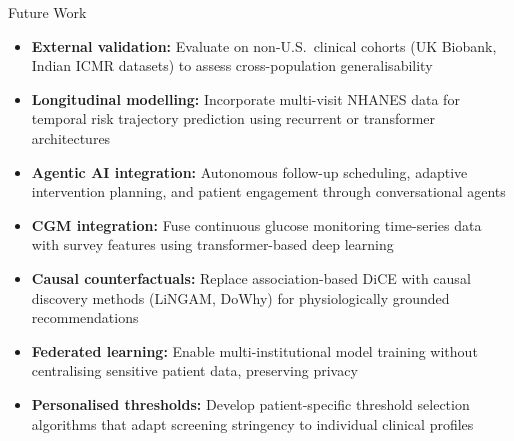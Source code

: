 \documentclass[aspectratio=169, 11pt]{beamer}
\begin{document}
\begin{frame}{Future Work}
  \small
  \begin{itemize}
    \setlength{\itemsep}{6pt}
    \item \textbf{External validation:} Evaluate on non-U.S.\ clinical cohorts (UK Biobank, Indian ICMR datasets) to assess cross-population generalisability
    \item \textbf{Longitudinal modelling:} Incorporate multi-visit NHANES data for temporal risk trajectory prediction using recurrent or transformer architectures
    \item \textbf{Agentic AI integration:} Autonomous follow-up scheduling, adaptive intervention planning, and patient engagement through conversational agents
    \item \textbf{CGM integration:} Fuse continuous glucose monitoring time-series data with survey features using transformer-based deep learning
    \item \textbf{Causal counterfactuals:} Replace association-based DiCE with causal discovery methods (LiNGAM, DoWhy) for physiologically grounded recommendations
    \item \textbf{Federated learning:} Enable multi-institutional model training without centralising sensitive patient data, preserving privacy
    \item \textbf{Personalised thresholds:} Develop patient-specific threshold selection algorithms that adapt screening stringency to individual clinical profiles
  \end{itemize}
\end{frame}
\end{document}
